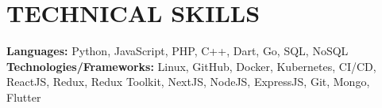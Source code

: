 \documentclass[letterpaper,11pt]{article}
\newcommand\sbullet[1][.5]{\mathbin{\vcenter{\hbox{\scalebox{#1}{$\bullet$}}}}}
\begin{document}
\section{TECHNICAL SKILLS}
 \begin{itemize}[leftmargin=0.15in, label={}]
    \small{\item{
     \textbf{\normalsize{Languages:}}{ \normalsize{Python, JavaScript, PHP, C++, Dart, Go,  SQL, NoSQL}} \\
     \textbf{\normalsize{Technologies/Frameworks:}}{\normalsize{ Linux, GitHub, Docker, Kubernetes, CI/CD, ReactJS, Redux, Redux Toolkit, NextJS, NodeJS, ExpressJS, Git, Mongo, Flutter}} \\
    }}
 \end{itemize}
 \vspace{-15pt}

 



\end{document}
